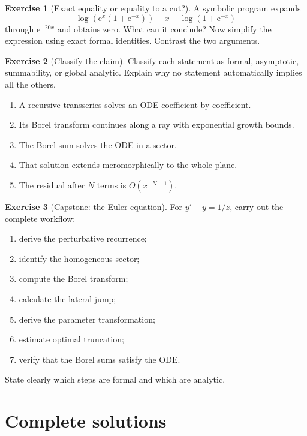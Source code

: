 \documentclass[11pt,oneside]{book}
\theoremstyle{definition}
\newtheorem{exercise}{Exercise}[chapter]
\theoremstyle{remark}
\newcommand{\e}{\mathrm{e}}
\newcommand{\bigO}{O}
\begin{document}
\begin{exercise}[Exact equality or equality to a cut?]
\label{ex:equality-cut}
A symbolic program expands
\[
  \log(\e^x(1+\e^{-x}))-x-\log(1+\e^{-x})
\]
through $\e^{-20x}$ and obtains zero. What can it conclude? Now simplify the
expression using exact formal identities. Contrast the two arguments.
\end{exercise}

\begin{exercise}[Classify the claim]
\label{ex:classify-claim}
Classify each statement as formal, asymptotic, summability, or global analytic.
Explain why no statement automatically implies all the others.
\begin{enumerate}[label=(\alph*)]
\item A recursive transseries solves an ODE coefficient by coefficient.
\item Its Borel transform continues along a ray with exponential growth bounds.
\item The Borel sum solves the ODE in a sector.
\item That solution extends meromorphically to the whole plane.
\item The residual after $N$ terms is $\bigO(x^{-N-1})$.
\end{enumerate}
\end{exercise}

\begin{exercise}[Capstone: the Euler equation]
\label{ex:euler-capstone}
For $y'+y=1/z$, carry out the complete workflow:
\begin{enumerate}[label=(\alph*)]
\item derive the perturbative recurrence;
\item identify the homogeneous sector;
\item compute the Borel transform;
\item calculate the lateral jump;
\item derive the parameter transformation;
\item estimate optimal truncation;
\item verify that the Borel sums satisfy the ODE.
\end{enumerate}
State clearly which steps are formal and which are analytic.
\end{exercise}

\chapter{Complete solutions}
\label{ch:solutions}
\end{document}
